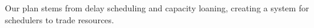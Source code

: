 
Our plan stems from delay scheduling and capacity loaning, creating a system for schedulers 
to trade resources.
